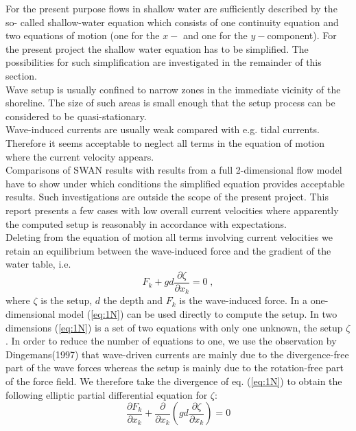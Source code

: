 \documentclass[12pt]{book}
\begin{document}
For the present purpose flows in shallow water are sufficiently described by the so-
called shallow-water equation which consists of one continuity equation and two
equations of motion (one for the $x-$ and one for the $y-$component). For the present
project the shallow water equation has to be simplified. The possibilities for such
simplification are investigated in the remainder of this section.
\\[2ex]
\noindent
Wave setup is usually confined to narrow zones in the immediate vicinity of the
shoreline. The size of such areas is small enough that the setup process can be
considered to be quasi-stationary.
\\[2ex]
\noindent
Wave-induced currents are usually weak compared with e.g. tidal currents.
Therefore it seems acceptable to neglect all terms in the equation of motion where
the current velocity appears.
\\[2ex]
\noindent
Comparisons of SWAN results with results from a full 2-dimensional flow model
have to show under which conditions the simplified equation provides acceptable
results. Such investigations are outside the scope of the present project. This report
presents a few cases with low overall current velocities where apparently the
computed setup is reasonably in accordance with expectations.
\\[2ex]
\noindent
Deleting from the equation of motion all terms involving current velocities we retain
an equilibrium between the wave-induced force and the gradient of the water table,
i.e.
\begin{equation}
F_{k} + gd \frac{\partial \zeta}{\partial x_{k}} = 0\;,
\label{eq:1N}
\end{equation}
where $\zeta$ is the setup, $d$ the depth and $F_{k}$ is the wave-induced force.
In a one-dimensional model (\ref{eq:1N}) can be used directly to compute the setup. In two
dimensions (\ref{eq:1N}) is a set of two equations with only one unknown,
the setup $\zeta$. In
order to reduce the number of equations to one, we use the observation by
Dingemans(1997) that wave-driven currents are mainly due to the
divergence-free part of the wave forces whereas the setup is mainly due to the
rotation-free part of the force field. We therefore take the divergence of eq. (\ref{eq:1N}) to
obtain the following elliptic partial differential equation for $\zeta$:
\begin{equation}
\frac{\partial F_{k}}{\partial x_{k}} + \frac{\partial}{\partial x_{k}}
(gd \frac{\partial \zeta}{\partial x_{k}}) = 0
\label{eq:2N}
\end{equation}
\end{document}
